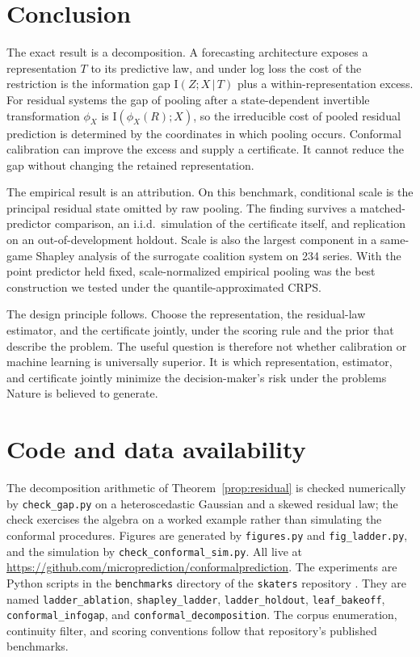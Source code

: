 \documentclass[11pt]{article}
\theoremstyle{remark}
\newcommand{\I}{\mathrm{I}}
\newcommand{\given}{\,|\,}
\begin{document}
\section{Conclusion}\label{sec:conclusion}

The exact result is a decomposition. A forecasting architecture exposes a representation $T$
to its predictive law, and under log loss the cost of the restriction is the information gap
$\I(Z;X\given T)$ plus a within-representation excess. For residual systems the gap of pooling
after a state-dependent invertible transformation $\phi_X$ is $\I(\phi_X(R);X)$, so the
irreducible cost of pooled residual prediction is determined by the coordinates in which
pooling occurs. Conformal calibration can improve the excess and supply a certificate. It cannot reduce
the gap without changing the retained representation.

The empirical result is an attribution. On this benchmark, conditional scale is the principal residual state omitted by raw
pooling. The finding survives a matched-predictor comparison, an i.i.d.\ simulation of the
certificate itself, and replication on an out-of-development holdout. Scale is also the
largest component in a same-game Shapley analysis of the surrogate coalition system on 234
series. With the point predictor held fixed,
scale-normalized empirical pooling was the best construction we tested under the
quantile-approximated CRPS.

The design principle follows. Choose the representation, the residual-law estimator, and the
certificate jointly, under the scoring rule and the prior that describe the problem. The
useful question is therefore not whether calibration or machine learning is universally
superior. It is which representation, estimator, and certificate jointly minimize the
decision-maker's risk under the problems Nature is believed to generate.

\section*{Code and data availability}
\begin{sloppypar}
 The decomposition arithmetic of Theorem~\ref{prop:residual} is checked numerically by
\texttt{check\_gap.py} on a heteroscedastic Gaussian and a skewed residual law; the check
exercises the algebra on a worked example rather than simulating the conformal procedures. Figures are generated by \texttt{figures.py} and \texttt{fig\_ladder.py}, and the
simulation by \texttt{check\_conformal\_sim.py}. All live at
\url{https://github.com/microprediction/conformalprediction}. The experiments are Python scripts in the \texttt{benchmarks} directory of the
\texttt{skaters} repository \citep{cotton_skaters}. They are named \texttt{ladder\_ablation}, \texttt{shapley\_ladder},
\texttt{ladder\_holdout}, \texttt{leaf\_bakeoff}, \texttt{conformal\_infogap}, and
\texttt{conformal\_decomposition}. The corpus enumeration, continuity filter, and scoring conventions
follow that repository's published benchmarks.
\end{sloppypar}
\end{document}
